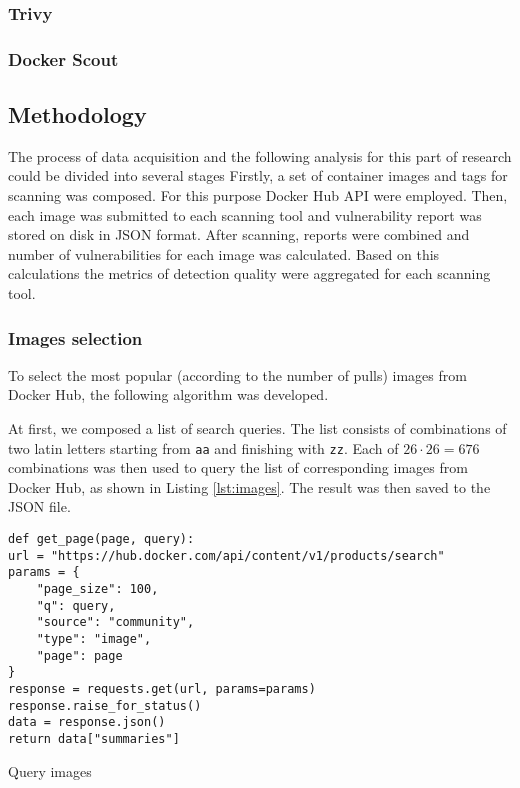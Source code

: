 \subsubsection{Trivy}


\subsubsection{Docker Scout}





\subsection{Methodology}
The process of data acquisition and the following analysis for this part of research could be divided into several stages Firstly, a set of container images and tags for scanning was composed. For this purpose Docker Hub API were employed. Then, each image was submitted to each scanning tool and vulnerability report was stored on disk in JSON format. After scanning, reports were combined and number of vulnerabilities for each image was calculated. Based on this calculations the metrics of detection quality were aggregated for each scanning tool.

\subsubsection{Images selection}

To select the most popular (according to the number of pulls) images from Docker Hub, the following algorithm was developed.

At first, we composed a list of search queries. The list consists of combinations of two latin letters starting from \texttt{aa} and finishing with \texttt{zz}. Each of $26 \cdot 26 = 676$ combinations was then used to query the list of corresponding images from Docker Hub, as shown in Listing \ref{lst:images}. The result was then saved to the JSON file.
\begin{listing}[htp]
    \centering
    \begin{minipage}{0.8\linewidth}
        \begin{verbatim}
def get_page(page, query):
url = "https://hub.docker.com/api/content/v1/products/search"
params = {
    "page_size": 100,
    "q": query,
    "source": "community",
    "type": "image",
    "page": page
}
response = requests.get(url, params=params)
response.raise_for_status()
data = response.json()
return data["summaries"]
        \end{verbatim}
    \end{minipage}
    \caption{Query images}
    \label{lst:images}
\end{listing}

